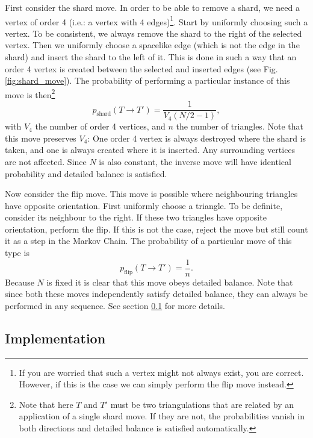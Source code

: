 First consider the shard move. In order to be able to remove a shard, we need a vertex of order 4 (i.e.: a vertex with 4 edges)\footnote{If you are worried that such a vertex might not always exist, you are correct. However, if this is the case we can simply perform the flip move instead.}. Start by uniformly choosing such a vertex. To be consistent, we always remove the shard to the right of the selected vertex. Then we uniformly choose a spacelike edge (which is not the edge in the shard) and insert the shard to the left of it. This is done in such a way that an order 4 vertex is created between the selected and inserted edges (see Fig. \ref{fig:shard_move}). The probability of performing a particular instance of this move is then\footnote{Note that here $T$ and $T'$ must be two triangulations that are related by an application of a single shard move. If they are not, the probabilities vanish in both directions and detailed balance is satisfied automatically.}
\begin{equation}
    p_{\text{shard}}(T \to T') = \frac{1}{V_4 (N/2 - 1)},
\end{equation}
with $V_4$ the number of order 4 vertices, and $n$ the number of triangles. Note that this move preserves $V_4$: One order 4 vertex is always destroyed where the shard is taken, and one is always created where it is inserted. Any surrounding vertices are not affected. Since $N$ is also constant, the inverse move will have identical probability and detailed balance is satisfied.

Now consider the flip move. This move is possible where neighbouring triangles have opposite orientation. First uniformly choose a triangle. To be definite, consider its neighbour to the right. If these two triangles have opposite orientation, perform the flip. If this is not the case, reject the move but still count it as a step in the Markov Chain. The probability of a particular move of this type is
\begin{equation}
    p_{\text{flip}}(T \to T') = \frac{1}{n}.
\end{equation}
Because $N$ is fixed it is clear that this move obeys detailed balance. Note that since both these moves independently satisfy detailed balance, they can always be performed in any sequence. See section \ref{sec:implementation} for more details.

\subsection{Implementation}\label{sec:implementation}

